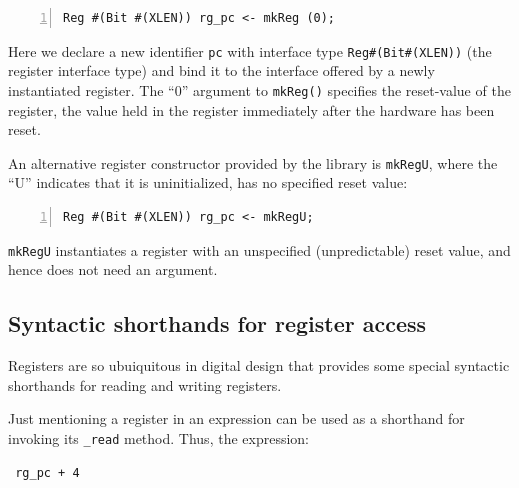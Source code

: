 
{\footnotesize
\begin{Verbatim}[frame=single, numbers=left]
   Reg #(Bit #(XLEN)) rg_pc <- mkReg (0);
\end{Verbatim}
}

Here we declare a new identifier \verb|pc| with interface type
\verb|Reg#(Bit#(XLEN))| (the register interface type) and bind it to
the interface offered by a newly instantiated register.  The ``0''
argument to \verb|mkReg()| specifies the reset-value of the register,
{\ie} the value held in the register immediately after the hardware
has been reset.

An alternative register constructor provided by the {\BSV} library is
{\tt mkRegU}, where the ``U'' indicates that it is uninitialized,
{\ie} has no specified reset value:


{\footnotesize
\begin{Verbatim}[frame=single, numbers=left]
   Reg #(Bit #(XLEN)) rg_pc <- mkRegU;
\end{Verbatim}
}

\verb|mkRegU| instantiates a register with an unspecified
(unpredictable) reset value, and hence does not need an argument.


\subsection{Syntactic shorthands for register access}

\label{Sec_Register_syntactic_shorthands}


Registers are so ubuiquitous in digital design that {\BSV} provides some
special syntactic shorthands for reading and writing registers.

Just mentioning a register in an expression can be used as a shorthand
for invoking its \verb|_read| method.  Thus, the expression:

\begin{tabbing}\footnotesize\tt
\hmmmm  rg\_pc + 4
\end{tabbing}

